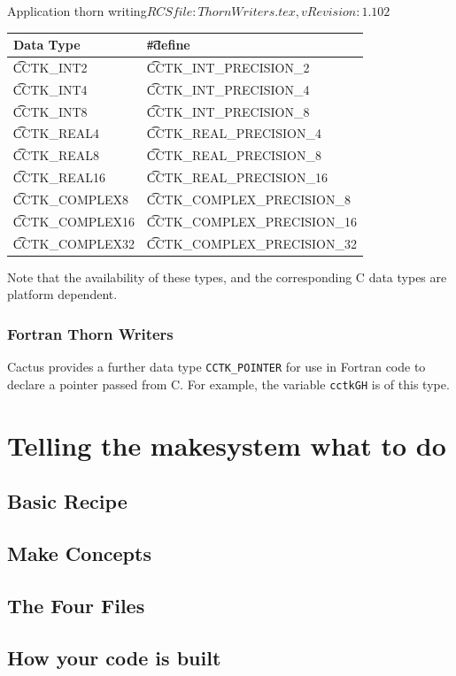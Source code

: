 \begin{cactuspart}{2}{Application thorn writing}{$RCSfile: ThornWriters.tex,v $}{$Revision: 1.102 $}
\begin{center}
\begin{tabular}{|l|l|}
\hline
Data Type & {\t \#define}\\
\hline
{\t CCTK\_INT2}      & {\t CCTK\_INT\_PRECISION\_2}      \\
{\t CCTK\_INT4}      & {\t CCTK\_INT\_PRECISION\_4}      \\
{\t CCTK\_INT8}      & {\t CCTK\_INT\_PRECISION\_8}      \\
{\t CCTK\_REAL4}     & {\t CCTK\_REAL\_PRECISION\_4}     \\
{\t CCTK\_REAL8}     & {\t CCTK\_REAL\_PRECISION\_8}     \\
{\t CCTK\_REAL16}    & {\t CCTK\_REAL\_PRECISION\_16}    \\
{\t CCTK\_COMPLEX8}  & {\t CCTK\_COMPLEX\_PRECISION\_8}  \\
{\t CCTK\_COMPLEX16} & {\t CCTK\_COMPLEX\_PRECISION\_16} \\
{\t CCTK\_COMPLEX32} & {\t CCTK\_COMPLEX\_PRECISION\_32} \\
\hline
\end{tabular}
\end{center}

Note that the availability of these types, and the corresponding
C data types are platform dependent.

\subsection{Fortran Thorn Writers}

Cactus provides a further data type {\tt CCTK\_POINTER}
for use in Fortran code to declare a pointer passed from C.
For example, the variable {\tt cctkGH} is of this type.


\chapter{Telling the makesystem what to do}

\section{Basic Recipe}

\section{Make Concepts}

\section{The Four Files}

\section{How your code is built}

\end{cactuspart}
